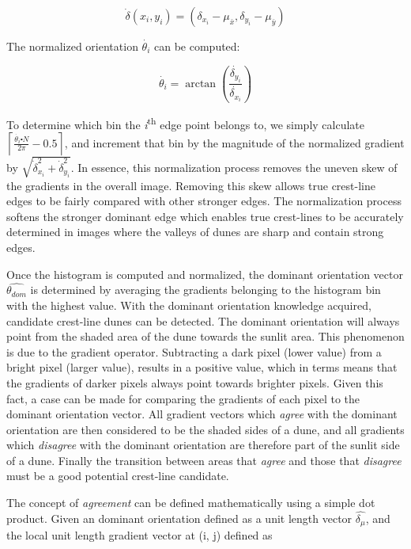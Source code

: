 \begin{equation}
\dot{\delta}\left(x_{i},y_{i}\right)=\left(\delta_{x_{i}}-\mu_{\bar{x}},\delta_{y_{i}}-\mu_{\bar{y}}\right)
\end{equation}

The normalized orientation $\dot{\theta_{i}}$ can be computed:

\begin{equation}
\dot{\theta_{i}}=\arctan\left(\frac{\dot{\delta_{y_{i}}}}{\dot{\delta_{x_{i}}}}\right)
\end{equation}

To determine which bin the \emph{i}\textsuperscript{th} edge point belongs to, we simply calculate $\left\lceil \frac{\dot{\theta_{i}}\centerdot N}{2\pi}-0.5\right\rceil $,	and increment that bin by the magnitude of the normalized gradient	by $\sqrt{\dot{\delta}_{x_{i}}^{2}+\dot{\delta}_{y_{i}}^{2}}$. In essence, this normalization process removes the uneven skew of the gradients in the overall image. Removing this skew allows true crest-line edges to be fairly compared with other stronger edges. The normalization process softens the stronger dominant edge which enables true crest-lines to be accurately determined in images where the valleys of dunes are sharp and contain strong edges.

Once the histogram is computed and normalized, the dominant orientation vector $\hat{\theta_{dom}}$ is determined by averaging the gradients belonging to the histogram bin with the highest value. With the dominant orientation knowledge acquired, candidate crest-line dunes can be detected. The dominant orientation will always point from the shaded area of the dune towards the sunlit area. This phenomenon is due to the gradient operator. Subtracting a dark pixel (lower value) from a bright pixel (larger value), results in a positive value, which in terms means that the gradients of darker pixels always point towards brighter pixels. Given this fact, a case can be made for comparing the gradients of each pixel to the dominant orientation vector. All gradient vectors which \emph{agree} with the dominant orientation are then considered to be the shaded sides of a dune, and all gradients which \emph{disagree} with the dominant orientation are therefore part of the sunlit side of a dune. Finally the transition between areas that \emph{agree} and those that \emph{disagree} must be a good potential crest-line candidate.

The concept of \emph{agreement} can be defined mathematically using a simple dot product. Given an dominant orientation defined as a unit length vector $\hat{\delta_{\mu}}$, and the local unit length gradient vector at (i, j) defined as

